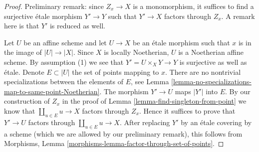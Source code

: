 \documentclass{stacks-project}
\theoremstyle{plain}
\theoremstyle{definition}
\theoremstyle{remark}
\numberwithin{equation}{subsection}
\begin{document}
\begin{proof}
Preliminary remark: since $Z_x \to X$ is a monomorphism, it suffices to find
a surjective \'etale morphism $Y' \to Y$ such that $Y' \to X$
factors through $Z_x$. A remark here is that $Y'$ is reduced as well.

\medskip\noindent
Let $U$ be an affine scheme and let $U \to X$ be an \'etale morphism
such that $x$ is in the image of $|U| \to |X|$. Since $X$ is locally
Noetherian, $U$ is a Noetherian affine scheme. By assumption (1)
we see that $Y' = U \times_X Y \to Y$ is surjective as well as \'etale.
Denote $E \subset |U|$ the set of points mapping to $x$.
There are no nontrivial specializations between the elements of $E$, see
Lemma \ref{lemma-no-specializations-map-to-same-point-Noetherian}.
The morphism $Y' \to U$ maps $|Y'|$ into $E$. By our construction
of $Z_x$ in the proof of Lemma \ref{lemma-find-singleton-from-point}
we know that $\coprod_{u \in E} u \to X$ factors through $Z_x$.
Hence it suffices to prove that $Y' \to U$ factors through
$\coprod_{u \in E} u \to X$. After replacing $Y'$ by an \'etale covering
by a scheme (which we are allowed by our preliminary remark), this follows
from Morphisms, Lemma \ref{morphisms-lemma-factor-through-set-of-points}.
\end{proof}
\end{document}
